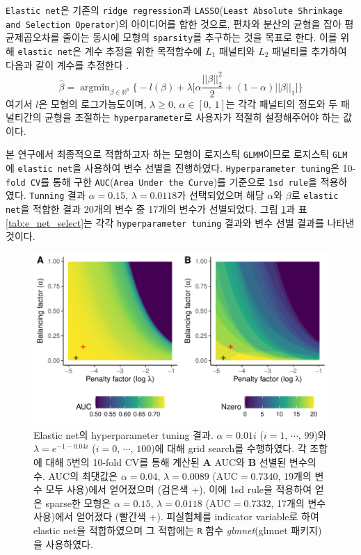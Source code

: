 \documentclass[11pt,onecolumn,twoside,a4size]{gsag3jnl}
\DeclareMathOperator*{\argmin}{argmin}
\begin{document}
\texttt{Elastic net}은 기존의 \texttt{ridge regression}과 \texttt{LASSO}(\texttt{Least Absolute Shrinkage and Selection Operator})의 아이디어를 합한 것으로, 편차와 분산의 균형을 잡아 평균제곱오차를 줄이는 동시에 모형의 \texttt{sparsity}를 추구하는 것을 목표로 한다. 이를 위해 \texttt{elastic net}은 계수 추정을 위한 목적함수에 $L_1$ 패널티와 $L_2$ 패널티를 추가하여 다음과 같이 계수를 추정한다 \texttt{\citep{friedman2010regularization}}.
\begin{equation}
  \widehat{\beta}=\argmin_{\beta\in\mathbb{R}^p}\bigg\{-l(\beta)+\lambda\bigg[\alpha\frac{||\beta||_2^2}{2}+(1-\alpha)||\beta||_1\bigg]\bigg\}
\end{equation}
여기서 $l$은 모형의 로그가능도이며, $\lambda\geq0,\,\alpha\in[0,\,1]$는 각각 패널티의 정도와 두 패널티간의 균형을 조절하는 \texttt{hyperparameter}로 사용자가 적절히 설정해주어야 하는 값이다.

본 연구에서 최종적으로 적합하고자 하는 모형이 로지스틱 \texttt{GLMM}이므로 로지스틱 \texttt{GLM}에 \texttt{elastic net}을 사용하여 변수 선별을 진행하였다. \texttt{Hyperparameter tuning}은 10-\texttt{fold CV}를 통해 구한 \texttt{AUC}(\texttt{Area Under the Curve})를 기준으로 \texttt{1sd rule}을 적용하였다. \texttt{Tunning} 결과 $\alpha=0.15,\,\lambda=0.0118$가 선택되었으며 해당 $\alpha$와 $\beta$로 \texttt{elastic net}을 적합한 결과 20개의 변수 중 17개의 변수가 선별되었다. 그림 \ref{fig:e_net_tuning}과 표 \ref{tab:e_net_select}는 각각 \texttt{hyperparameter tuning} 결과와 변수 선별 결과를 나타낸 것이다.

\begin{figure}[tp]
  \renewcommand{\familydefault}{\sfdefault}\normalfont
  \centering
  \includegraphics[width=0.7\linewidth]{Enet.pdf}
  \caption{\small Elastic net의 hyperparameter tuning 결과. $\alpha=0.01i$ ($i=1,\,\cdots,\,99$)와 $\lambda=e^{-1-0.04i}$ ($i=0,\,\cdots,\,100$)에 대해 grid search를 수행하였다. 각 조합에 대해 5번의 10-fold CV를 통해 계산된 \textbf{A} AUC와 \textbf{B} 선별된 변수의 수. AUC의 최댓값은 $\alpha=0.04,\,\lambda=0.0089$ ($\mathrm{AUC}=0.7340$, 19개의 변수 모두 사용)에서 얻어졌으며 (검은색 +), 이에 1sd rule을 적용하여 얻은 sparse한 모형은 $\alpha=0.15,\,\lambda=0.0118$ ($\mathrm{AUC}=0.7332$, 17개의 변수 사용)에서 얻어졌다 (빨간색 +). 피실험체를 indicator variable로 하여 elastic net을 적합하였으며 그 적합에는 \texttt{R} 함수 \textrm{\textit{glmnet}}(glmnet 패키지)을 사용하였다.}
  \label{fig:e_net_tuning}
\end{figure}
\end{document}
